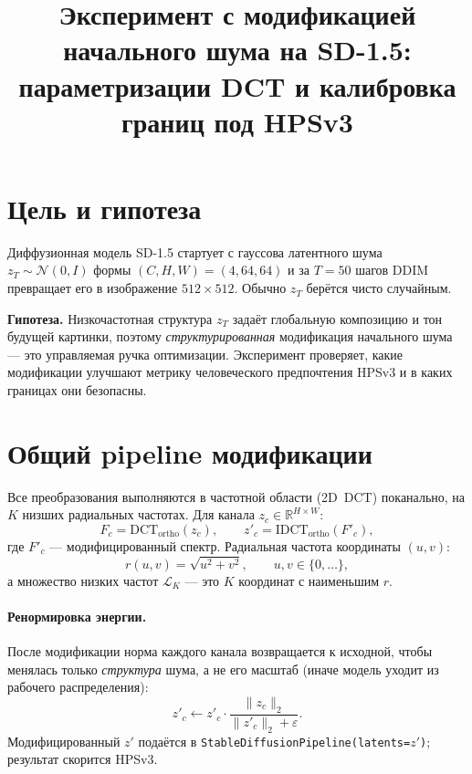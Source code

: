 \documentclass[11pt,a4paper]{article}
\title{Эксперимент с модификацией начального шума на SD-1.5:\\
параметризации DCT и калибровка границ под HPSv3}
\author{}
\date{}
\begin{document}
\maketitle

\section{Цель и гипотеза}

Диффузионная модель SD-1.5 стартует с гауссова латентного шума
$z_T \sim \mathcal{N}(0, I)$ формы $(C, H, W) = (4, 64, 64)$ и за $T=50$
шагов DDIM превращает его в изображение $512\times512$. Обычно $z_T$ берётся
чисто случайным.

\textbf{Гипотеза.} Низкочастотная структура $z_T$ задаёт глобальную композицию
и тон будущей картинки, поэтому \emph{структурированная} модификация начального
шума — это управляемая ручка оптимизации. Эксперимент проверяет, какие
модификации улучшают метрику человеческого предпочтения HPSv3 и в каких
границах они безопасны.

\section{Общий pipeline модификации}

Все преобразования выполняются в частотной области (2D~DCT) поканально, на
$K$ низших радиальных частотах. Для канала $z_c \in \mathbb{R}^{H\times W}$:
\begin{equation}
F_c = \mathrm{DCT}_{\text{ortho}}(z_c), \qquad
z'_c = \mathrm{IDCT}_{\text{ortho}}(F'_c),
\end{equation}
где $F'_c$ — модифицированный спектр. Радиальная частота координаты $(u,v)$:
\begin{equation}
r(u,v) = \sqrt{u^2 + v^2}, \qquad u,v \in \{0,\dots\},
\end{equation}
а множество низких частот $\mathcal{L}_K$ — это $K$ координат с наименьшим $r$.

\paragraph{Ренормировка энергии.} После модификации норма каждого канала
возвращается к исходной, чтобы менялась только \emph{структура} шума, а не его
масштаб (иначе модель уходит из рабочего распределения):
\begin{equation}
z'_c \leftarrow z'_c \cdot \frac{\lVert z_c \rVert_2}{\lVert z'_c \rVert_2 + \varepsilon}.
\end{equation}
Модифицированный $z'$ подаётся в \texttt{StableDiffusionPipeline(latents=$z'$)};
результат скорится HPSv3.
\end{document}
